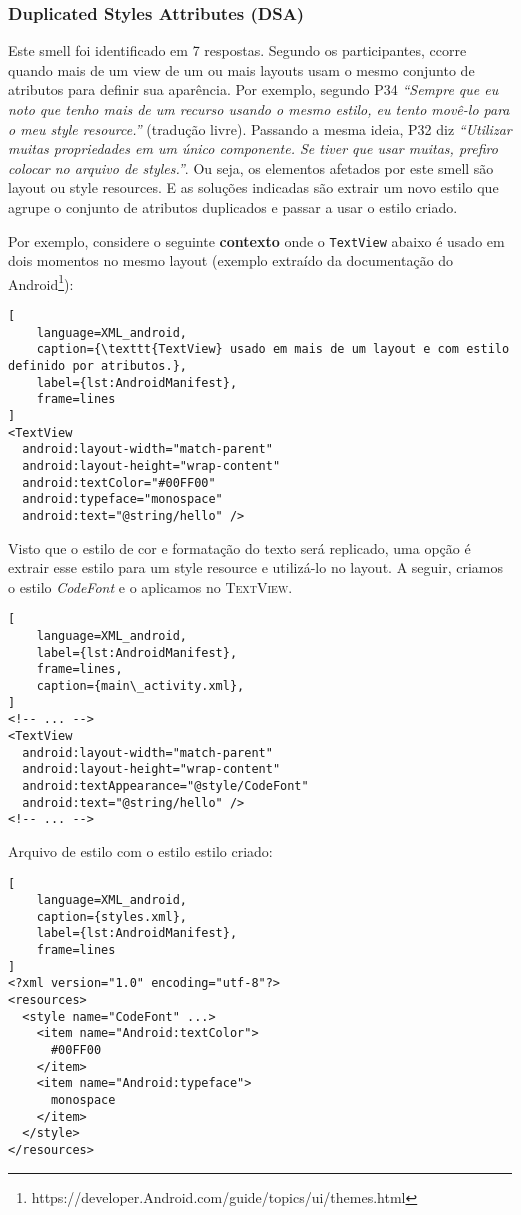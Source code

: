 \subsubsection{Duplicated Styles Attributes (DSA)}
Este smell foi identificado em 7 respostas. Segundo os participantes, ccorre quando mais de um view de um ou mais layouts usam o mesmo conjunto de atributos para definir sua apar\^encia. Por exemplo, segundo P34 \textit{``Sempre que eu noto que tenho mais de um recurso usando o mesmo estilo, eu tento movê-lo para o meu \textit{style resource}.''} (tradução livre). Passando a mesma ideia, P32 diz \textit{``Utilizar muitas propriedades em um único componente. Se tiver que usar muitas, prefiro colocar no arquivo de styles.''}. Ou seja, os elementos afetados por este smell são layout ou style resources. E as soluções indicadas são extrair um novo estilo que agrupe o conjunto de atributos duplicados e passar a usar o estilo criado.

Por exemplo, considere o seguinte \textbf{contexto} onde o \texttt{TextView} abaixo \'e usado em dois momentos no mesmo layout (exemplo extra\'ido da documenta\c{c}\~ao do Android\footnote{https://developer.Android.com/guide/topics/ui/themes.html}):

\begin{lstlisting}[
	language=XML_android, 
	caption={\texttt{TextView} usado em mais de um layout e com estilo definido por atributos.}, 
	label={lst:AndroidManifest},
	frame=lines
]
<TextView
  android:layout-width="match-parent"
  android:layout-height="wrap-content"
  android:textColor="#00FF00"
  android:typeface="monospace"
  android:text="@string/hello" />
\end{lstlisting}

Visto que o estilo de cor e formatação do texto será replicado, uma op\c{c}\~ao é extrair esse estilo para um style resource e utilizá-lo no layout. A seguir, criamos o estilo \textit{CodeFont} e o aplicamos no \textsc{TextView}.

\begin{lstlisting}[
	language=XML_android, 
	label={lst:AndroidManifest},
	frame=lines,
	caption={main\_activity.xml},
]
<!-- ... -->
<TextView
  android:layout-width="match-parent"
  android:layout-height="wrap-content"
  android:textAppearance="@style/CodeFont"
  android:text="@string/hello" />
<!-- ... -->
\end{lstlisting}

Arquivo de estilo com o estilo estilo  criado:

\begin{lstlisting}[
	language=XML_android, 
	caption={styles.xml}, 
	label={lst:AndroidManifest},
	frame=lines
]
<?xml version="1.0" encoding="utf-8"?>
<resources>
  <style name="CodeFont" ...>
    <item name="Android:textColor">
      #00FF00
    </item>
    <item name="Android:typeface">
      monospace
    </item>
  </style>
</resources>
\end{lstlisting}



